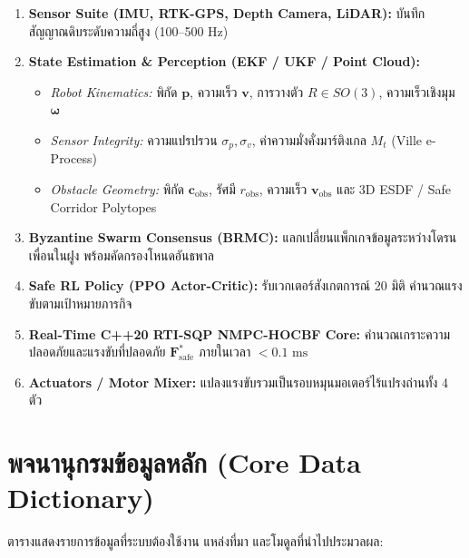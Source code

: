 \documentclass[11pt,a4paper]{article}
\begin{document}
\begin{tcolorbox}[colback=lightbg,colframe=primary,arc=2mm,title=\textbf{แผนผังขั้นตอนการประมวลผลข้อมูล (Data Pipeline)}]
\begin{enumerate}[leftmargin=5mm,itemsep=1.5mm]
    \item \textbf{Sensor Suite (IMU, RTK-GPS, Depth Camera, LiDAR):} บันทึกสัญญาณดิบระดับความถี่สูง (100--500 Hz)
    \item \textbf{State Estimation \& Perception (EKF / UKF / Point Cloud):}
    \begin{itemize}[leftmargin=5mm]
        \item \textsl{Robot Kinematics:} พิกัด $\mathbf{p}$, ความเร็ว $\mathbf{v}$, การวางตัว $R \in SO(3)$, ความเร็วเชิงมุม $\boldsymbol{\omega}$
        \item \textsl{Sensor Integrity:} ความแปรปรวน $\sigma_p, \sigma_v$, ค่าความมั่งคั่งมาร์ติงเกล $M_t$ (Ville e-Process)
        \item \textsl{Obstacle Geometry:} พิกัด $\mathbf{c}_{\text{obs}}$, รัศมี $r_{\text{obs}}$, ความเร็ว $\mathbf{v}_{\text{obs}}$ และ 3D ESDF / Safe Corridor Polytopes
    \end{itemize}
    \item \textbf{Byzantine Swarm Consensus (BRMC):} แลกเปลี่ยนแพ็กเกจข้อมูลระหว่างโดรนเพื่อนในฝูง พร้อมคัดกรองโหนดอันธพาล
    \item \textbf{Safe RL Policy (PPO Actor-Critic):} รับเวกเตอร์สังเกตการณ์ 20 มิติ คำนวณแรงขับตามเป้าหมายภารกิจ
    \item \textbf{Real-Time C++20 RTI-SQP NMPC-HOCBF Core:} คำนวณเกราะความปลอดภัยและแรงขับที่ปลอดภัย $\mathbf{F}^*_{\text{safe}}$ ภายในเวลา $< 0.1\text{ ms}$
    \item \textbf{Actuators / Motor Mixer:} แปลงแรงขับรวมเป็นรอบหมุนมอเตอร์ไร้แปรงถ่านทั้ง 4 ตัว
\end{enumerate}
\end{tcolorbox}

\vspace{2mm}

\section{พจนานุกรมข้อมูลหลัก (Core Data Dictionary)}
ตารางแสดงรายการข้อมูลที่ระบบต้องใช้งาน แหล่งที่มา และโมดูลที่นำไปประมวลผล:
\end{document}
